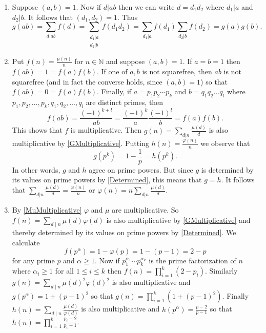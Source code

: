 \documentclass[12pt]{article}
\begin{document}
\begin{enumerate}
\item\label{GMultiplicative} %
Suppose $\left(a,b\right)=1$. Now if $d|ab$ then we can
write $d=d_1d_2$ where $d_1|a$ and $d_2|b$. It follows that
$\left(d_1,d_2\right)=1$. Thus
\[g\left(ab\right)=\sum_{d|ab}f\left(d\right)
=\sum_{\substack{d_1|a\\d_2|b}}f\left(d_1d_2\right)
=\sum_{d_1|a}f\left(d_1\right)\sum_{d_2|b}f\left(d_2\right)
=g\left(a\right)g\left(b\right).\]

\item\label{MuMultiplicative} %
Put $f\left(n\right)=\frac{\mu\left(n\right)}{n}$ for $n\in\mathbb{N}$
and suppose $\left(a,b\right)=1$.
If $a=b=1$ then $f\left(ab\right)=1=f\left(a\right)f\left(b\right)$.
If one of $a,b$ is not squarefree, then $ab$ is not squarefree
(and in fact the converse holds, since $\left(a,b\right)=1$)
so that $f\left(ab\right)=0=f\left(a\right)f\left(b\right)$.
Finally, if $a=p_1p_2\cdots p_k$ and $b=q_1q_2\ldots q_l$
where $p_1,p_2,\ldots,p_k,q_1,q_2,\ldots,q_l$ are distinct
primes, then
\[f\left(ab\right)=\frac{\left(-1\right)^{k+l}}{ab}
=\frac{\left(-1\right)^k}{a}\frac{\left(-1\right)^l}{b}
=f\left(a\right)f\left(b\right).\]
This shows that $f$ is multiplicative.
Then $g\left(n\right)=\sum_{d|n}
\frac{\mu\left(d\right)}{d}$ is also multiplicative
by \autoref{GMultiplicative}. 
Putting $h\left(n\right)=\frac{\varphi\left(n\right)}{n}$
we observe that
\[g\left(p^k\right)=1-\frac{1}{p}=h\left(p^k\right).\] 
In other words, $g$ and $h$ agree on prime powers.
But since $g$ is determined by its values
on prime powers by \autoref{Determined}, this means that $g=h$.
It follows that
$\sum_{d|n}\frac{\mu\left(d\right)}{d}
=\frac{\varphi\left(n\right)}{n}$
or $\varphi\left(n\right)
=n\sum_{d|n}\frac{\mu\left(d\right)}{d}$.

\item %
By \autoref{MuMultiplicative} $\varphi$ and $\mu$ are multiplicative.
So $f\left(n\right)=\sum_{d\mid n}\mu\left(d\right)
\varphi\left(d\right)$ is also
multiplicative by \autoref{GMultiplicative}
and thereby determined by its values on prime powers by
\autoref{Determined}.
We calculate \[f\left(p^\alpha\right)=1-\varphi\left(p\right)
=1-\left(p-1\right)=2-p\]
for any prime $p$ and $\alpha\ge 1$.
Now if $p_1^{\alpha_1}\cdots p_k^{\alpha_k}$
is the prime factorization of $n$ where $\alpha_i\ge 1$
for all $1\le i\le k$ then
$f\left(n\right)=\prod_{i=1}^k\left(2-p_i\right)$.
Similarly $g\left(n\right)
=\sum_{d\mid n}\mu\left(d\right)^2
\varphi\left(d\right)^2$ is also
multiplicative and $g\left(p^\alpha\right)=1+\left(p-1\right)^2$
so that $g\left(n\right)
=\prod_{i=1}^k\left(1+\left(p-1\right)^2\right)$.
Finally $h\left(n\right)
=\sum_{d\mid n}\frac{\mu\left(d\right)}
{\varphi\left(d\right)}$ is also
multiplicative and $h\left(p^\alpha\right)=\frac{p-2}{p-1}$
so that $h\left(n\right)
=\prod_{i=1}^k\frac{p_i-2}{p_i-1}$.


\end{enumerate}
\end{document}
